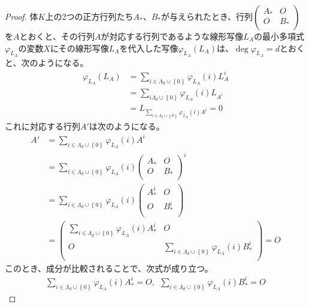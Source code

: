 \documentclass[dvipdfmx]{jsarticle}
\begin{document}
\begin{proof}
体$K$上の2つの正方行列たち$A_{*}$、$B_{*}$が与えられたとき、行列$\begin{pmatrix}
A_{*} & O \\
O & B_{*} \\
\end{pmatrix}$を$A$とおくと、その行列$A$が対応する行列であるような線形写像$L_{A}$の最小多項式$\varphi_{L_{A}}$の変数$X$にその線形写像$L_{A}$を代入した写像$\varphi_{L_{A}}\left( L_{A} \right)$は、$\deg{\varphi_{L_{A}}} = d$とおくと、次のようになる。
\begin{align*}
\varphi_{L_{A}}\left( L_{A} \right) &= \sum_{i \in \varLambda_{d} \cup \left\{ 0 \right\}} {\varphi_{L_{A}}(i)L_{A}^{i}}\\
&= \sum_{i\varLambda_{d} \cup \left\{ 0 \right\}} {\varphi_{L_{A}}(i)L_{A^{i}}}\\
&= L_{\sum_{i \in \varLambda_{d} \cup \left\{ 0 \right\}} {\varphi_{L_{A}}(i)A^{i}}} = 0
\end{align*}
これに対応する行列$A'$は次のようになる。
\begin{align*}
A' &= \sum_{i \in \varLambda_{d} \cup \left\{ 0 \right\}} {\varphi_{L_{A}}(i)A^{i}}\\
&= \sum_{i \in \varLambda_{d} \cup \left\{ 0 \right\}} {\varphi_{L_{A}}(i)\begin{pmatrix}
A_{*} & O \\
O & B_{*} \\
\end{pmatrix}^{i}}\\
&= \sum_{i \in \varLambda_{d} \cup \left\{ 0 \right\}} {\varphi_{L_{A}}(i)\begin{pmatrix}
A_{*}^{i} & O \\
O & B_{*}^{i} \\
\end{pmatrix}}\\
&= \begin{pmatrix}
\sum_{i \in \varLambda_{d} \cup \left\{ 0 \right\}} {\varphi_{L_{A}}(i)A_{*}^{i}} & O \\
O & \sum_{i \in \varLambda_{d} \cup \left\{ 0 \right\}} {\varphi_{L_{A}}(i)B_{*}^{i}} \\
\end{pmatrix} = O
\end{align*}
このとき、成分が比較されることで、次式が成り立つ。
\begin{align*}
\sum_{i \in \varLambda_{d} \cup \left\{ 0 \right\}} {\varphi_{L_{A}}(i)A_{*}^{i}} = O,\ \ \sum_{i \in \varLambda_{d} \cup \left\{ 0 \right\}} {\varphi_{L_{A}}(i)B_{*}^{i}} = O

\end{align*}
\end{proof}
\end{document}
